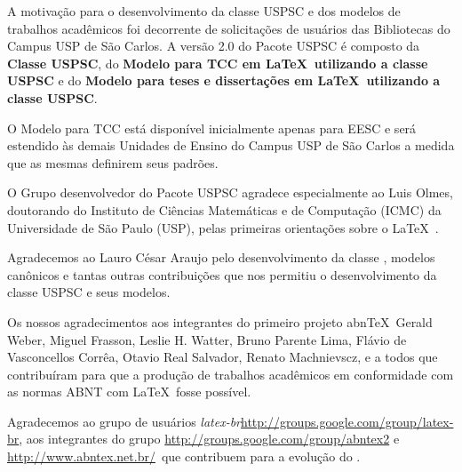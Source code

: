 \begin{agradecimentos}
	A motivação para o desenvolvimento da classe USPSC e dos modelos de trabalhos acadêmicos foi decorrente de solicitações de usuários das Bibliotecas do Campus USP de São Carlos. A versão 2.0 do Pacote USPSC é composto da \textbf{Classe USPSC}, do \textbf{Modelo para TCC em \LaTeX\ utilizando a classe USPSC} e do \textbf{Modelo para teses e dissertações em \LaTeX\ utilizando a classe USPSC}.
	
	O Modelo para TCC está disponível inicialmente apenas para EESC e será estendido às demais Unidades de Ensino do Campus USP de São Carlos a medida que as mesmas definirem seus padrões.
	
	O Grupo desenvolvedor do Pacote USPSC agradece especialmente ao Luis Olmes, doutorando do Instituto de Ciências Matemáticas e de Computação (ICMC) da Universidade de São Paulo (USP), pelas primeiras orientações sobre o \LaTeX\ . 
	
	Agradecemos ao Lauro César Araujo pelo desenvolvimento da classe  \abnTeX, modelos canônicos e tantas outras contribuições que nos permitiu o desenvolvimento da classe USPSC e seus modelos.
	
	Os nossos agradecimentos aos integrantes do primeiro
	projeto abn\TeX\, Gerald Weber, Miguel Frasson, Leslie H. Watter, Bruno Parente Lima, Flávio de Vasconcellos Corrêa, Otavio Real
	Salvador, Renato Machnievscz, e a todos que contribuíram para que a produção de trabalhos acadêmicos em conformidade com
	as normas ABNT com \LaTeX\ fosse possível.
	
	Agradecemos ao grupo de usuários
	\emph{latex-br}{\url{http://groups.google.com/group/latex-br}}, aos integrantes do grupo
	\emph{\abnTeX}{\url{http://groups.google.com/group/abntex2}  e \url{http://www.abntex.net.br/}}~que contribuem para a evolução do \abnTeX.
\end{agradecimentos}
